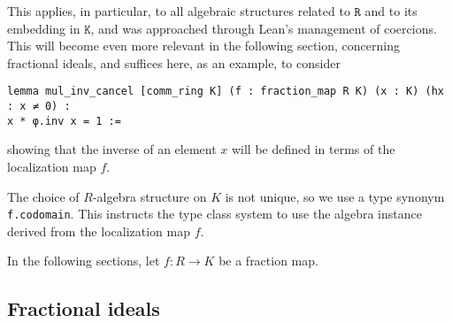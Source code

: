 \documentclass[a4paper,USenglish,cleveref, autoref, thm-restate]{lipics-v2021}
\newcommand{\lean}[1]{\texttt{#1}\xspace} %
\newcommand{\Q}{\mathbb{Q}}
\newcommand{\Z}{\mathbb{Z}}
\begin{document}
This applies, in particular, to all algebraic structures related to $\lean{R}$ and to its embedding in $\lean{K}$, and was approached through Lean's management of coercions. This will become even more relevant in the following section, concerning fractional ideals, and suffices here, as an example, to consider 
\begin{lstlisting}
lemma mul_inv_cancel [comm_ring K] (f : fraction_map R K) (x : K) (hx : x ≠ 0) :
x * φ.inv x = 1 :=
\end{lstlisting}
showing that the inverse of an element $x$ will be defined in terms of the localization map $f$.
%
%
%
%
%
%
%

The choice of $R$-algebra structure on $K$ is not unique, so we use a type synonym \lean{f.codomain}. This instructs the type class system to use the algebra instance derived from the localization map $f$.

In the following sections, let $f : R \to K$ be a fraction map.
\subsection{Fractional ideals}
\end{document}
